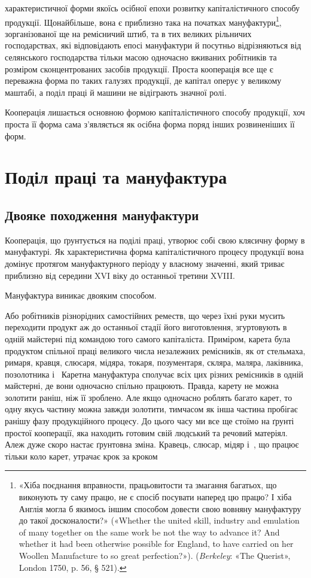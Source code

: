 \parcont{}  %
характеристичної форми якоїсь осібної епохи розвитку капіталістичного
способу продукції. Щонайбільше, вона є приблизно
така на початках мануфактури\footnote{
«Хіба поєднання вправности, працьовитости та змагання багатьох,
що виконують ту саму працю, не є спосіб посувати наперед цю працю?
І хіба Англія могла б якимось іншим способом довести свою вовняну мануфактуру
до такої досконалости?» («Whether the united skill, industry
and emulation of many together on the same work be not the way to advance
it? And whether it had been otherwise possible for England, to have
carried on her Woollen Manufacture to so great perfection?»). (\emph{Berkeley}: «The
Querist», London 1750, p. 56, § 521).
}, зорганізованої ще на ремісничий
штиб, та в тих великих рільничих господарствах, які відповідають
епосі мануфактури й посутньо відрізняються від селянського
господарства тільки масою одночасно вживаних робітників
та розміром сконцентрованих засобів продукції. Проста кооперація
все ще є переважна форма по таких галузях продукції, де
капітал оперує у великому маштабі, а поділ праці й машини не
відіграють значної ролі.

Кооперація лишається основною формою капіталістичного способу
продукції, хоч проста її форма сама з’являється як осібна
форма поряд інших розвиненіших її форм.

\section{Поділ праці та мануфактура}
\subsection{Двояке походження мануфактури}

Кооперація, що ґрунтується на поділі праці, утворює собі
свою клясичну форму в мануфактурі. Як характеристична форма
капіталістичного процесу продукції вона домінує протягом мануфактурного
періоду у власному значенні, який триває приблизно
від середини XVI віку до останньої третини XVIII.

Мануфактура виникає двояким способом.

Або робітників різнорідних самостійних реместв, що через
їхні руки мусить переходити продукт аж до останньої стадії його
виготовлення, згуртовують в одній майстерні під командою того
самого капіталіста. Приміром, карета була продуктом спільної
праці великого числа незалежних ремісників, як от стельмаха,
римаря, кравця, слюсаря, мідяра, токаря, позументаря, скляра,
маляра, лаківника, позолотника і~ Каретна мануфактура
сполучає всіх цих різних ремісників в одній майстерні, де вони
одночасно спільно працюють. Правда, карету не можна золотити
раніш, ніж її зроблено. Але якщо одночасно роблять багато карет,
то одну якусь частину можна завжди золотити, тимчасом як
інша частина пробігає ранішу фазу продукційного процесу. До
цього часу ми все ще стоїмо на ґрунті простої кооперації, яка
находить готовим свій людський та речовий матеріял. Алеж
дуже скоро настає ґрунтовна зміна. Кравець, слюсар, мідяр і~, що працює тільки коло карет, утрачає крок за кроком
\parbreak{}  %
